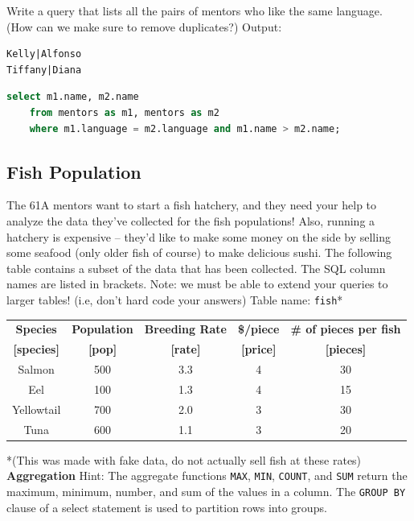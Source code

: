 \documentclass{exam}
\begin{document}
\begin{questions}
\begin{blocksection}
\question Write a query that lists all the pairs of mentors who like the same language. (How can we make sure to remove duplicates?) \newline
Output:
\begin{lstlisting}
Kelly|Alfonso
Tiffany|Diana
\end{lstlisting}
\begin{solution}[2in]
\begin{lstlisting}[language=SQL]
select m1.name, m2.name
    from mentors as m1, mentors as m2
    where m1.language = m2.language and m1.name > m2.name;
\end{lstlisting}
\end{solution}
\end{blocksection}


\begin{blocksection}
\section{Fish Population}
The 61A mentors want to start a fish hatchery, and they need your help to analyze the data they've collected for the fish populations! Also, running a hatchery is expensive -- they'd like to make some money on the side by selling some seafood (only older fish of course) to make delicious sushi. \newline
\newline
The following table contains a subset of the data that has been collected. The SQL column names are listed in brackets. Note: we must be able to extend your queries to larger tables! (i.e, don't hard code your answers) \newline
\newline
Table name: \texttt{fish}*
\begin{center}
\begin{tabular}{ |c|c|c|c|c| }
 \hline
 \textbf{Species} & \textbf{Population} & \textbf{Breeding Rate} & \textbf{\$/piece} & \textbf{\# of pieces per fish} \\
  \textbf{[species]} & \textbf{[pop]} & \textbf{[rate]} & \textbf{[price]} & \textbf{[pieces]} \\
 \hline
 Salmon & 500 & 3.3 & 4 & 30 \\
 \hline
 Eel & 100 & 1.3 & 4 & 15 \\
 \hline
  Yellowtail & 700 & 2.0 & 3 & 30 \\
 \hline
 Tuna & 600 & 1.1 & 3 & 20 \\
 \hline
\end{tabular}
\end{center}
*(This was made with fake data, do not actually sell fish at these rates)
\question \textbf{Aggregation} Hint: The aggregate functions \texttt{MAX}, \texttt{MIN}, \texttt{COUNT}, and \texttt{SUM} return the maximum, minimum, number, and sum of the values in a column. The  \texttt{GROUP BY} clause of a select statement is used to partition rows into groups.


\end{blocksection}
\end{questions}
\end{document}
